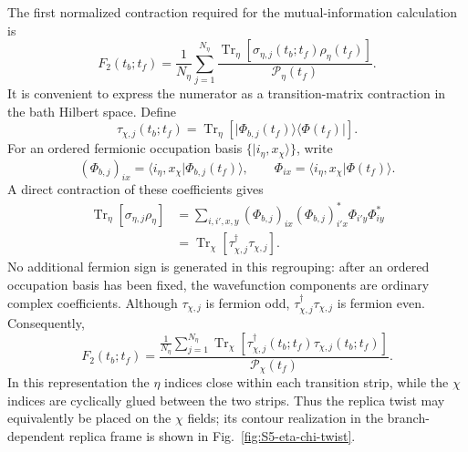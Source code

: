 \documentclass[11pt,a4paper]{article}
\begin{document}
The first normalized contraction required for the mutual-information
calculation is
\begin{equation}
  F_2(t_b;t_f)
  =
  \frac{1}{N_\eta}
  \sum_{j=1}^{N_\eta}
  \frac{
  \operatorname{Tr}_{\eta}
  \left[
  \sigma_{\eta,j}(t_b;t_f)\rho_\eta(t_f)
  \right]
  }{
  \mathcal P_\eta(t_f)
  } .
\label{eq:S5-F2-density}
\end{equation}
It is convenient to express the numerator as a transition-matrix
contraction in the bath Hilbert space. Define
\begin{equation}
  \tau_{\chi,j}(t_b;t_f)
  =
  \operatorname{Tr}_{\eta}
  \left[
  \lvert\Phi_{b,j}(t_f)\rangle
  \langle\Phi(t_f)\rvert
  \right].
\label{eq:S5-transition-matrix}
\end{equation}
For an ordered fermionic occupation basis
\(\{\lvert i_\eta,x_\chi\rangle\}\), write
\begin{equation}
  (\Phi_{b,j})_{ix}
  =
  \langle i_\eta,x_\chi\vert\Phi_{b,j}(t_f)\rangle,
  \qquad
  \Phi_{ix}
  =
  \langle i_\eta,x_\chi\vert\Phi(t_f)\rangle .
\label{eq:S5-wavefunction-components}
\end{equation}
A direct contraction of these coefficients gives
\begin{equation}
\begin{aligned}
  \operatorname{Tr}_{\eta}
  \left[
  \sigma_{\eta,j}\rho_\eta
  \right]
  &=
  \sum_{i,i',x,y}
  (\Phi_{b,j})_{ix}
  (\Phi_{b,j})^*_{i'x}
  \Phi_{i'y}
  \Phi^*_{iy}
  \\
  &=
  \operatorname{Tr}_{\chi}
  \left[
  \tau_{\chi,j}^{\dagger}
  \tau_{\chi,j}
  \right].
\end{aligned}
\label{eq:S5-transition-identity}
\end{equation}
No additional fermion sign is generated in this regrouping: after an ordered
occupation basis has been fixed, the wavefunction components are ordinary
complex coefficients. Although \(\tau_{\chi,j}\) is fermion odd,
\(\tau_{\chi,j}^{\dagger}\tau_{\chi,j}\) is fermion even. Consequently,
\begin{equation}
  F_2(t_b;t_f)
  =
  \frac{
  \displaystyle
  \frac{1}{N_\eta}
  \sum_{j=1}^{N_\eta}
  \operatorname{Tr}_{\chi}
  \left[
  \tau_{\chi,j}^{\dagger}(t_b;t_f)
  \tau_{\chi,j}(t_b;t_f)
  \right]
  }{
  \mathcal P_\chi(t_f)
  } .
\label{eq:S5-F2-transition}
\end{equation}
In this representation the \(\eta\) indices close within each transition
strip, while the \(\chi\) indices are cyclically glued between the two
strips. Thus the replica twist may equivalently be placed on the \(\chi\)
fields; its contour realization in the branch-dependent replica frame is
shown in Fig.~\ref{fig:S5-eta-chi-twist}.
\end{document}
